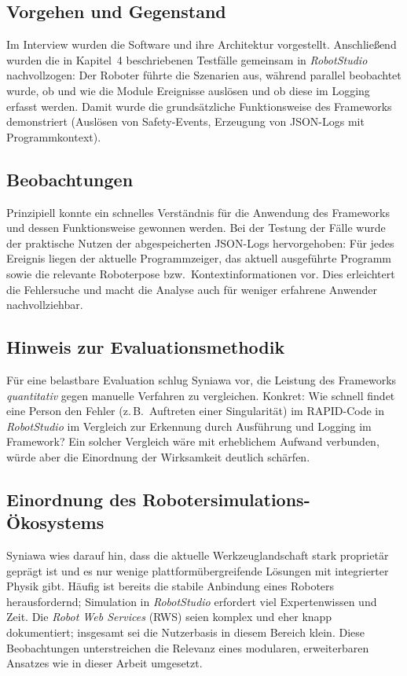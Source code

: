 \subsection{Vorgehen und Gegenstand}

Im Interview wurden die Software und ihre Architektur vorgestellt. Anschließend
wurden die in Kapitel~4 beschriebenen Testfälle gemeinsam in \emph{RobotStudio}
nachvollzogen: Der Roboter führte die Szenarien aus, während parallel beobachtet
wurde, ob und wie die Module Ereignisse auslösen und ob diese im Logging erfasst
werden. Damit wurde die grundsätzliche Funktionsweise des Frameworks
demonstriert (Auslösen von Safety-Events, Erzeugung von JSON-Logs mit
Programmkontext).

\subsection{Beobachtungen}

Prinzipiell konnte ein schnelles Verständnis für die Anwendung des Frameworks
und dessen Funktionsweise gewonnen werden. Bei der Testung der Fälle wurde der
praktische Nutzen der abgespeicherten JSON-Logs hervorgehoben: Für jedes
Ereignis liegen der aktuelle Programmzeiger, das aktuell ausgeführte Programm
sowie die relevante Roboterpose bzw.\ Kontextinformationen vor. Dies erleichtert
die Fehlersuche und macht die Analyse auch für weniger erfahrene Anwender
nachvollziehbar.

\subsection{Hinweis zur Evaluationsmethodik}

Für eine belastbare Evaluation schlug Syniawa vor, die Leistung des Frameworks
\emph{quantitativ} gegen manuelle Verfahren zu vergleichen. Konkret: Wie schnell
findet eine Person den Fehler (z.\,B.\ Auftreten einer Singularität) im
RAPID-Code in \emph{RobotStudio} im Vergleich zur Erkennung durch Ausführung und
Logging im Framework? Ein solcher Vergleich wäre mit erheblichem Aufwand
verbunden, würde aber die Einordnung der Wirksamkeit deutlich schärfen.

\subsection{Einordnung des Robotersimulations-Ökosystems}

Syniawa wies darauf hin, dass die aktuelle Werkzeuglandschaft stark proprietär
geprägt ist und es nur wenige plattformübergreifende Lösungen mit integrierter
Physik gibt. Häufig ist bereits die stabile Anbindung eines Roboters
herausfordernd; Simulation in \emph{RobotStudio} erfordert viel Expertenwissen
und Zeit. Die \emph{Robot Web Services} (RWS) seien komplex und eher knapp
dokumentiert; insgesamt sei die Nutzerbasis in diesem Bereich klein. Diese
Beobachtungen unterstreichen die Relevanz eines modularen, erweiterbaren
Ansatzes wie in dieser Arbeit umgesetzt.

